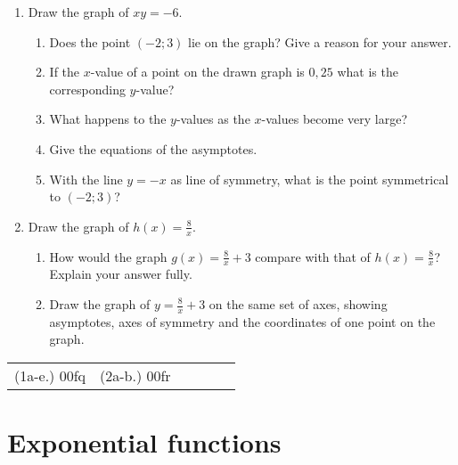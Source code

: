 \begin{exercises}{}{
\begin{enumerate}[noitemsep, label=\textbf{\arabic*}. ] 
\item Draw the graph of $xy=-6$.
  \begin{enumerate}[noitemsep, label=\textbf{(\alph*)} ] 
  \item Does the point $(-2; 3)$ lie on the graph? Give a reason for your answer.
  \item If the $x$-value of a point on the drawn graph is $0,25$ what is the corresponding $y$-value?
  \item What happens to the $y$-values as the $x$-values become very large?
  \item Give the equations of the asymptotes.
  \item With the line $y=-x$ as line of symmetry, what is the point symmetrical to $(-2; 3)$?
  \end{enumerate}
\item Draw the graph of $h(x)=\frac{8}{x}$.
  \begin{enumerate}[noitemsep, label=\textbf{(\alph*)} ] 
  \item How would the graph $g(x)=\frac{8}{x}+3$ compare with that of $h(x)=\frac{8}{x}$? Explain your answer fully.
  \item Draw the graph of $y=\frac{8}{x}+3$ on the same set of axes, showing asymptotes, axes of symmetry and the coordinates of one point on the graph.
  \end{enumerate}
\end{enumerate}
\practiceinfo
\par 
\par \begin{tabular}[h]{cccccc}
(1a-e.) 00fq&  (2a-b.) 00fr& \end{tabular}
}
\end{exercises}

\section{Exponential functions}

